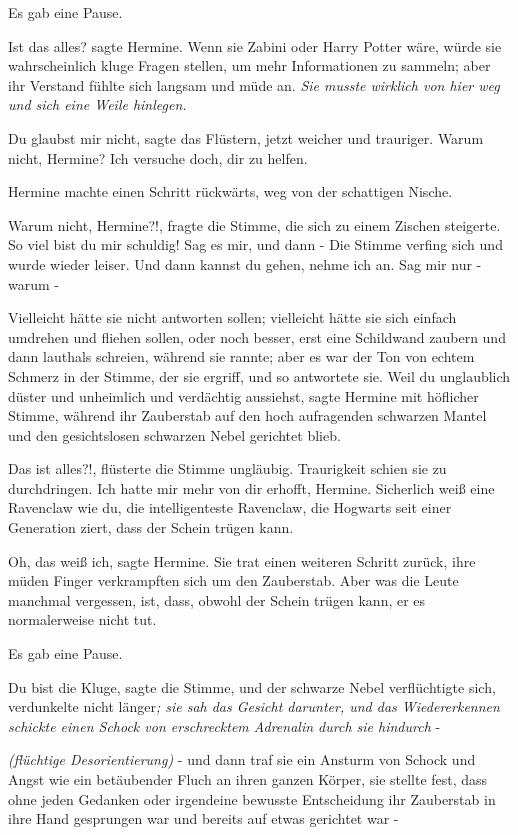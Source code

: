 Es gab eine Pause.

\glqq Ist das alles?\grqq{} sagte Hermine. Wenn sie Zabini oder Harry Potter
wäre, würde sie wahrscheinlich kluge Fragen stellen, um mehr Informationen zu
sammeln; aber ihr Verstand fühlte sich langsam und müde an. \emph{Sie musste
wirklich von hier weg und sich eine Weile hinlegen.}

\glqq Du glaubst mir nicht\grqq{}, sagte das Flüstern, jetzt weicher und
trauriger. \glqq Warum nicht, Hermine? Ich versuche doch, dir zu helfen.\grqq{}

Hermine machte einen Schritt rückwärts, weg von der schattigen Nische.

\glqq Warum nicht, Hermine?!\grqq{}, fragte die Stimme, die sich zu einem
Zischen steigerte. \glqq So viel bist du mir schuldig! Sag es mir, und dann
-\grqq{} Die Stimme verfing sich und wurde wieder leiser. \glqq Und dann kannst
du gehen, nehme ich an. Sag mir nur - warum -\grqq{}

Vielleicht hätte sie nicht antworten sollen; vielleicht hätte sie sich einfach
umdrehen und fliehen sollen, oder noch besser, erst eine Schildwand zaubern und
dann lauthals schreien, während sie rannte; aber es war der Ton von echtem
Schmerz in der Stimme, der sie ergriff, und so antwortete sie. \glqq Weil du
unglaublich düster und unheimlich und verdächtig aussiehst\grqq{}, sagte Hermine
mit höflicher Stimme, während ihr Zauberstab auf den hoch aufragenden schwarzen
Mantel und den gesichtslosen schwarzen Nebel gerichtet blieb.

\glqq Das ist alles?!\grqq{}, flüsterte die Stimme ungläubig. Traurigkeit schien
sie zu durchdringen. \glqq Ich hatte mir mehr von dir erhofft, Hermine.
Sicherlich weiß eine Ravenclaw wie du, die intelligenteste Ravenclaw, die
Hogwarts seit einer Generation ziert, dass der Schein trügen kann.\grqq{}

\glqq Oh, das weiß ich\grqq{}, sagte Hermine. Sie trat einen weiteren Schritt
zurück, ihre müden Finger verkrampften sich um den Zauberstab. \glqq Aber was
die Leute manchmal vergessen, ist, dass, obwohl der Schein trügen kann, er es
normalerweise nicht tut.\grqq{}

Es gab eine Pause.

\glqq Du bist die Kluge\grqq{}, sagte die Stimme, und der schwarze Nebel
verflüchtigte sich, verdunkelte nicht länger\emph{; sie sah das Gesicht
darunter, und das Wiedererkennen schickte einen Schock von erschrecktem
Adrenalin durch sie hindurch} -

\emph{(flüchtige Desorientierung)}
\emph{ } - und dann traf sie ein Ansturm von Schock und Angst wie ein
betäubender Fluch an ihren ganzen Körper, sie stellte fest, dass ohne jeden
Gedanken oder irgendeine bewusste Entscheidung ihr Zauberstab in ihre Hand
gesprungen war und bereits auf etwas gerichtet war -

